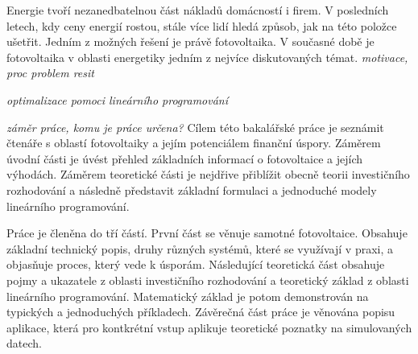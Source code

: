 Energie tvoří nezanedbatelnou část nákladů domácností i firem.
V posledních letech, kdy ceny energií rostou, stále více lidí hledá způsob, jak na této položce ušetřit.
Jedním z možných řešení je právě fotovoltaika.
V současné době je fotovoltaika v oblasti energetiky jedním z nejvíce diskutovaných témat.
\textit{motivace, proc problem resit}

\textit{optimalizace pomoci lineárního programování}

\textit{záměr práce, komu je práce určena?}
Cílem této bakalářské práce je seznámit čtenáře s oblastí fotovoltaiky a jejím potenciálem finanční úspory.
Záměrem úvodní části je úvést přehled základních informací o fotovoltaice a jejích výhodách.
Záměrem teoretické části je nejdřive přiblížit obecně teorii investičního rozhodování a následně představit základní formulaci a jednoduché modely lineárního programování.

Práce je členěna do tří částí.
První část se věnuje samotné fotovoltaice.
Obsahuje základní technický popis, druhy různých systémů, které se využívají v praxi, a objasňuje proces, který vede k úsporám.
Následující teoretická část obsahuje pojmy a ukazatele z oblasti investičního rozhodování a teoretický základ z oblasti lineárního programování.
Matematický základ je potom demonstrován na typických a jednoduchých příkladech.
Závěrečná část práce je věnována popisu aplikace, která pro kontkrétní vstup aplikuje teoretické poznatky na simulovaných datech.
